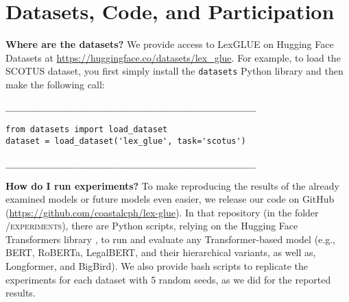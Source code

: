 \documentclass[11pt]{article}
\begin{document}


\appendix


\section{Datasets, Code, and Participation}
\label{sec:codebase}

\noindent\textbf{Where are the datasets?} We provide access to LexGLUE on Hugging Face Datasets \cite{lhoest2021datasets} at \url{https://huggingface.co/datasets/lex_glue}.  For example, to load the SCOTUS dataset, you first simply install the \texttt{datasets} Python library and then make the following call:

{\scriptsize
\begin{verbatim}
___________________________________________________

from datasets import load_dataset 
dataset = load_dataset('lex_glue', task='scotus')

___________________________________________________
\end{verbatim}
}

\noindent\textbf{How do I run experiments?} To make reproducing the results of the already examined models or future models even easier, we release our code on GitHub (\url{https://github.com/coastalcph/lex-glue}). In that repository (in the folder \textsc{/experiments}), there are Python scripts, relying on the Hugging Face Transformers library \cite{wolf-etal-2020-transformers}, to run and evaluate any Transformer-based model (e.g., BERT, RoBERTa, LegalBERT, and their hierarchical variants, as well as, Longformer, and BigBird). We also provide bash scripts to replicate the experiments for each dataset with 5 random seeds, as we did for the reported results.\vspace{2mm}
\end{document}
